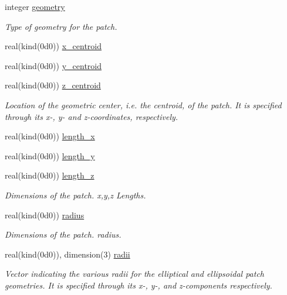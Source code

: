 \begin{DoxyCompactItemize}
\item 
integer \hyperlink{structm__derived__types_1_1ic__patch__parameters_a0bb1de07c2ae2a527f0a7d22aa4e76fc}{geometry}
\begin{DoxyCompactList}\small\item\em Type of geometry for the patch. \end{DoxyCompactList}\item 
real(kind(0d0)) \hyperlink{structm__derived__types_1_1ic__patch__parameters_a90b90c23fbe1d29d2471a68de8bee927}{x\+\_\+centroid}
\item 
real(kind(0d0)) \hyperlink{structm__derived__types_1_1ic__patch__parameters_a47043a83f55c4727caa84a2fa5f6d60b}{y\+\_\+centroid}
\item 
real(kind(0d0)) \hyperlink{structm__derived__types_1_1ic__patch__parameters_a950e604e891e3b9559dac102f2339977}{z\+\_\+centroid}
\begin{DoxyCompactList}\small\item\em Location of the geometric center, i.\+e. the centroid, of the patch. It is specified through its x-\/, y-\/ and z-\/coordinates, respectively. \end{DoxyCompactList}\item 
real(kind(0d0)) \hyperlink{structm__derived__types_1_1ic__patch__parameters_aa3f7195163ed6264d2bfa4c626286b44}{length\+\_\+x}
\item 
real(kind(0d0)) \hyperlink{structm__derived__types_1_1ic__patch__parameters_a469326131ced74f6ee68c0496e39f01c}{length\+\_\+y}
\item 
real(kind(0d0)) \hyperlink{structm__derived__types_1_1ic__patch__parameters_abcb4afe838a7faf97b05d7d43319adb6}{length\+\_\+z}
\begin{DoxyCompactList}\small\item\em Dimensions of the patch. x,y,z Lengths. \end{DoxyCompactList}\item 
real(kind(0d0)) \hyperlink{structm__derived__types_1_1ic__patch__parameters_ac29377a1f4b94223f5ca28e69a863848}{radius}
\begin{DoxyCompactList}\small\item\em Dimensions of the patch. radius. \end{DoxyCompactList}\item 
real(kind(0d0)), dimension(3) \hyperlink{structm__derived__types_1_1ic__patch__parameters_aabd07c7ad6697cfa45a0f21df98bb8c6}{radii}
\begin{DoxyCompactList}\small\item\em Vector indicating the various radii for the elliptical and ellipsoidal patch geometries. It is specified through its x-\/, y-\/, and z-\/components respectively. \end{DoxyCompactList}\item 

\end{DoxyCompactItemize}
